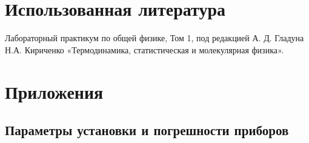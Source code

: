 \documentclass[12pt]{article}
\begin{document}
\section{Использованная литература}
\begin{thebibliography}{9}
    Лабораторный практикум по общей физике, Том 1, под редакцией А. Д. Гладуна
    Н.А. Кириченко «Термодинамика, статистическая и молекулярная физика».
\end{thebibliography}

\section{Приложения}
\subsection{Параметры установки и погрешности приборов} \label{app_1}
\end{document}
